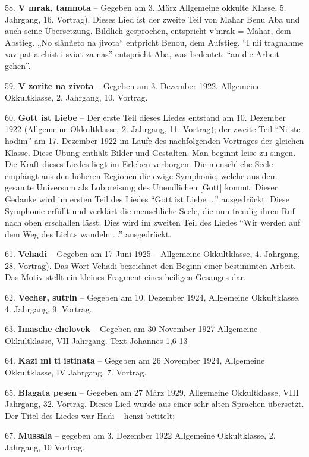 \documentclass[11pt,a5paper,twoside]{article}
\begin{document}
58. \textbf{V mrak, tamnota} -- Gegeben am 3. März Allgemeine okkulte Klasse, 5. Jahrgang, 16. Vortrag). Dieses Lied ist der zweite Teil von Mahar Benu Aba und auch seine Übersetzung. Bildlich gesprochen, entspricht v’mrak = Mahar, dem Abstieg. „No slånñeto na jivota“ entpricht Benou, dem Aufstieg. "`I nii tragnahme vav patia chist i sviat za nas"' entspricht Aba, was bedeutet: "`an die Arbeit gehen"'.

59. \textbf{V zorite na zivota} -- Gegeben am 3. Dezember 1922. Allgemeine Okkultklasse, 2. Jahrgang, 10. Vortrag.

60. \textbf{Gott ist Liebe} -- Der erste Teil dieses Liedes entstand am 10. Dezember 1922 (Allgemeine Okkultklasse, 2. Jahrgang, 11. Vortrag); der zweite Teil "`Ni ste hodim"' am 17. Dezember 1922 im Laufe des nachfolgenden Vortrages der gleichen Klasse. Diese Übung enthält Bilder und Gestalten. Man beginnt leise zu singen. Die Kraft dieses Liedes liegt im Erleben verborgen. Die menschliche Seele empfängt aus den höheren Regionen die ewige Symphonie, welche aus dem gesamte Universum als Lobpreisung des Unendlichen [Gott] kommt. Dieser Gedanke wird im ersten Teil des Liedes "`Gott ist Liebe ..."' ausgedrückt. Diese Symphonie erfüllt und verklärt die menschliche Seele, die nun freudig ihren Ruf nach oben erschallen lässt. Dies wird im zweiten Teil des Liedes "`Wir werden auf dem Weg des Lichts wandeln ..."' ausgedrückt. 

61. \textbf{Vehadi} -- Gegeben am 17 Juni 1925 -- Allgemeine Okkultklasse, 4. Jahrgang, 28. Vortrag). Das Wort Vehadi bezeichnet den Beginn einer bestimmten Arbeit. Das Motiv stellt ein kleines Fragment eines heiligen Gesanges dar.

62. \textbf{Vecher, sutrin} -- Gegeben am 10. Dezember 1924, Allgemeine Okkultklasse, 4. Jahrgang, 9. Vortrag.

63. \textbf{Imasche chelovek} -- Gegeben am 30 November 1927 Allgemeine Okkultklasse, VII Jahrgang. Text Johannes 1,6-13

64. \textbf{Kazi mi ti istinata} -- Gegeben am 26 November 1924, Allgemeine Okkultklasse, IV Jahrgang, 7. Vortrag.

65. \textbf{Blagata pesen} -- Gegeben am 27 März 1929, Allgemeine Okkultklasse, VIII Jahrgang, 32. Vortrag. Dieses Lied wurde aus einer sehr alten Sprachen übersetzt. Der Titel des Liedes war Hadi -- henzi betitelt; 

67. \textbf{Mussala} -- gegeben am 3. Dezember 1922 Allgemeine Okkultklasse, 2. Jahrgang, 10 Vortrag. 
\end{document}
